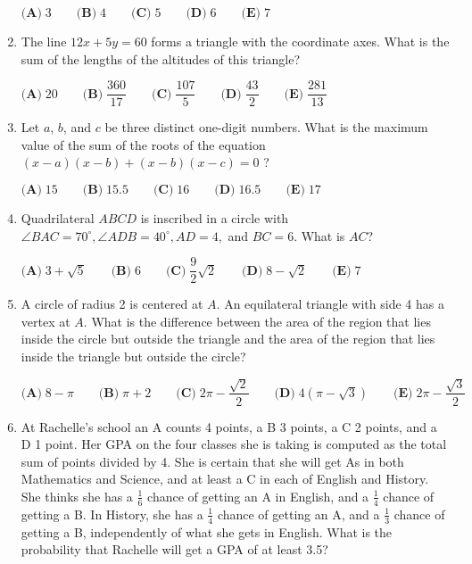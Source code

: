 \documentclass{article}
\begin{document}
\begin{enumerate}[label=\arabic*., itemsep=0.5em]
\(\textbf{(A)}\; 3 \qquad\textbf{(B)}\; 4 \qquad\textbf{(C)}\; 5 \qquad\textbf{(D)}\; 6 \qquad\textbf{(E)}\; 7\)\par \vspace{0.5em}\item The line \(12x+5y=60\) forms a triangle with the coordinate axes. What is the sum of the lengths of the altitudes of this triangle?

\(\textbf{(A)}\; 20 \qquad\textbf{(B)}\; \dfrac{360}{17} \qquad\textbf{(C)}\; \dfrac{107}{5} \qquad\textbf{(D)}\; \dfrac{43}{2} \qquad\textbf{(E)}\; \dfrac{281}{13}\)\par \vspace{0.5em}\item Let \(a\), \(b\), and \(c\) be three distinct one-digit numbers. What is the maximum value of the sum of the roots of the equation \((x-a)(x-b)+(x-b)(x-c)=0\) ?

\(\textbf{(A)}\; 15 \qquad\textbf{(B)}\; 15.5 \qquad\textbf{(C)}\; 16 \qquad\textbf{(D)}\; 16.5 \qquad\textbf{(E)}\; 17\)\par \vspace{0.5em}\item Quadrilateral \(ABCD\) is inscribed in a circle with \(\angle BAC=70^{\circ}, \angle ADB=40^{\circ}, AD=4,\) and \(BC=6\). What is \(AC\)?

\(\textbf{(A)}\; 3+\sqrt{5} \qquad\textbf{(B)}\; 6 \qquad\textbf{(C)}\; \dfrac{9}{2}\sqrt{2} \qquad\textbf{(D)}\; 8-\sqrt{2} \qquad\textbf{(E)}\; 7\)\par \vspace{0.5em}\item A circle of radius 2 is centered at \(A\). An equilateral triangle with side 4 has a vertex at \(A\). What is the difference between the area of the region that lies inside the circle but outside the triangle and the area of the region that lies inside the triangle but outside the circle?

\(\textbf{(A)}\; 8-\pi \qquad\textbf{(B)}\; \pi+2 \qquad\textbf{(C)}\; 2\pi-\dfrac{\sqrt{2}}{2} \qquad\textbf{(D)}\; 4(\pi-\sqrt{3}) \qquad\textbf{(E)}\; 2\pi-\dfrac{\sqrt{3}}{2}\)\par \vspace{0.5em}\item At Rachelle's school an A counts 4 points, a B 3 points, a C 2 points, and a D 1 point. Her GPA on the four classes she is taking is computed as the total sum of points divided by 4. She is certain that she will get As in both Mathematics and Science, and at least a C in each of English and History. She thinks she has a \(\tfrac{1}{6}\) chance of getting an A in English, and a \(\tfrac{1}{4}\) chance of getting a B. In History, she has a \(\tfrac{1}{4}\) chance of getting an A, and a \(\tfrac{1}{3}\) chance of getting a B, independently of what she gets in English. What is the probability that Rachelle will get a GPA of at least 3.5?


\end{enumerate}
\end{document}
